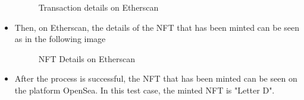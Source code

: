 \begin{itemize}
    \begin{figure} [H] \centering
    \caption{Transaction details on Etherscan}
    \label{fig:detail_transaction_etherscan}
    \end{figure}

    \item Then, on Etherscan, the details of the NFT that has been minted can be seen as in the following image

    \begin{figure} [H] \centering
    \caption{NFT Details on Etherscan}
    \label{fig:detail_nft_etherscan}
    \end{figure}

    \item After the process is successful, the NFT that has been minted can be seen on the platform OpenSea. In this test case, the minted NFT is "Letter D".


\end{itemize}
